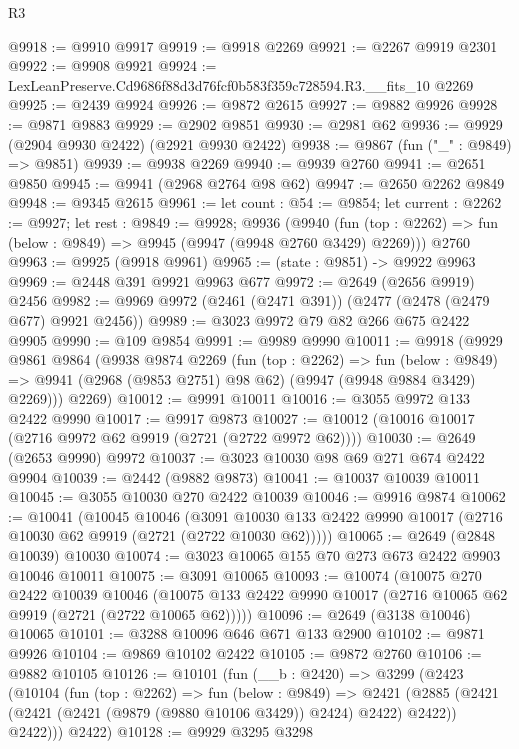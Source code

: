 \begin{lexlean}{R3}
\begin{coremodule}
@9918 := @9910 @9917
@9919 := @9918 @2269
@9921 := @2267 @9919 @2301
@9922 := @9908 @9921
@9924 := LexLeanPreserve.Cd9686f88d3d76fcf0b583f359c728594.R3.__fits_10 @2269
@9925 := @2439 @9924
@9926 := @9872 @2615
@9927 := @9882 @9926
@9928 := @9871 @9883
@9929 := @2902 @9851
@9930 := @2981 @62
@9936 := @9929 (@2904 @9930 @2422) (@2921 @9930 @2422)
@9938 := @9867 (fun ("_" : @9849) => @9851)
@9939 := @9938 @2269
@9940 := @9939 @2760
@9941 := @2651 @9850
@9945 := @9941 (@2968 @2764 @98 @62)
@9947 := @2650 @2262 @9849
@9948 := @9345 @2615
@9961 := let count : @54 := @9854;
  let current : @2262 := @9927;
  let rest : @9849 := @9928;
  @9936
    (@9940 (fun (top : @2262) => fun (below : @9849) => @9945 (@9947 (@9948 @2760 @3429) @2269)))
    @2760
@9963 := @9925 (@9918 @9961)
@9965 := (state : @9851) -> @9922 @9963
@9969 := @2448 @391 @9921 @9963 @677
@9972 := @2649 (@2656 @9919) @2456
@9982 := @9969 @9972 (@2461 (@2471 @391)) (@2477 (@2478 (@2479 @677) @9921 @2456))
@9989 := @3023 @9972 @79 @82 @266 @675 @2422 @9905
@9990 := @109 @9854
@9991 := @9989 @9990
@10011 := @9918
    (@9929
      @9861
      @9864
      (@9938
        @9874
        @2269
        (fun (top : @2262) =>
        fun (below : @9849) =>
        @9941 (@2968 (@9853 @2751) @98 @62) (@9947 (@9948 @9884 @3429) @2269)))
      @2269)
@10012 := @9991 @10011
@10016 := @3055 @9972 @133 @2422 @9990
@10017 := @9917 @9873
@10027 := @10012 (@10016 @10017 (@2716 @9972 @62 @9919 (@2721 (@2722 @9972 @62))))
@10030 := @2649 (@2653 @9990) @9972
@10037 := @3023 @10030 @98 @69 @271 @674 @2422 @9904
@10039 := @2442 (@9882 @9873)
@10041 := @10037 @10039 @10011
@10045 := @3055 @10030 @270 @2422 @10039
@10046 := @9916 @9874
@10062 := @10041
    (@10045
      @10046
      (@3091 @10030 @133 @2422 @9990 @10017 (@2716 @10030 @62 @9919 (@2721 (@2722 @10030 @62)))))
@10065 := @2649 (@2848 @10039) @10030
@10074 := @3023 @10065 @155 @70 @273 @673 @2422 @9903 @10046 @10011
@10075 := @3091 @10065
@10093 := @10074
    (@10075
      @270
      @2422
      @10039
      @10046
      (@10075 @133 @2422 @9990 @10017 (@2716 @10065 @62 @9919 (@2721 (@2722 @10065 @62)))))
@10096 := @2649 (@3138 @10046) @10065
@10101 := @3288 @10096 @646 @671 @133 @2900
@10102 := @9871 @9926
@10104 := @9869 @10102 @2422
@10105 := @9872 @2760
@10106 := @9882 @10105
@10126 := @10101
    (fun (__b : @2420) =>
    @3299
      (@2423
        (@10104
          (fun (top : @2262) =>
          fun (below : @9849) =>
          @2421
            (@2885 (@2421 (@2421 (@2421 (@9879 (@9880 @10106 @3429)) @2424) @2422) @2422))
            @2422)))
      @2422)
@10128 := @9929 @3295 @3298

\end{coremodule}
\end{lexlean}
